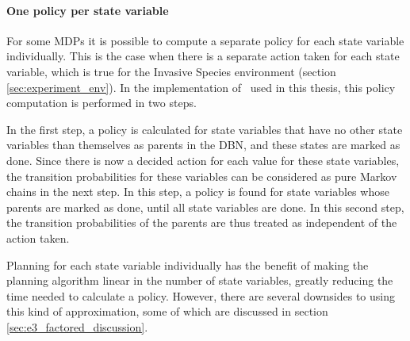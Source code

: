 \paragraph{One policy per state variable}
\label{sec:one_policy_per_state_variable}

For some MDPs it is possible to compute a separate policy for each state
variable individually. This is the case when there is a separate action taken
for each state variable, which is true for the Invasive Species environment
(section \ref{sec:experiment_env}). In the implementation of \etre\ used in
this thesis, this policy computation is performed in two steps. 

In the first step, a policy is calculated for state variables that have no
other state variables than themselves as parents in the DBN, and these states
are marked as done. Since there is now a decided action for each value for
these state variables, the transition probabilities for these variables can be
considered as pure Markov chains in the next step. In this step, a policy is
found for state variables whose parents are marked as done, until all state
variables are done.  In this second step, the transition probabilities of the
parents are thus treated as independent of the action taken.

Planning for each state variable individually has the benefit of making the
planning algorithm linear in the number of state variables, greatly reducing
the time needed to calculate a policy. However, there are several downsides to
using this kind of approximation, some of which are discussed in section
\ref{sec:e3_factored_discussion}.
